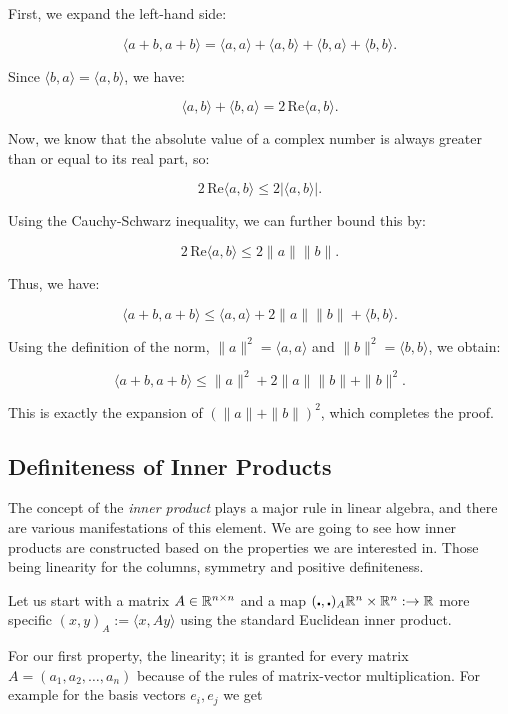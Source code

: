 First, we expand the left-hand side:

\[
    \langle a + b, a + b \rangle = \langle a, a \rangle + \langle a, b \rangle + \langle b, a \rangle + 
    \langle b, b \rangle.
\]

Since \( \langle b, a \rangle = \langle a, b \rangle \), we have:

\[
    \langle a, b \rangle + \langle b, a \rangle = 2 \, \text{Re} \langle a, b \rangle.
\]

Now, we know that the absolute value of a complex number is always greater than or equal to its 
real part, so:

\[
    2 \, \text{Re} \langle a, b \rangle \leq 2 |\langle a, b \rangle|.
\]

Using the Cauchy-Schwarz inequality, we can further bound this by:

\[
    2 \, \text{Re} \langle a, b \rangle \leq 2 \|a\| \|b\|.
\]

Thus, we have:

\[
    \langle a + b, a + b \rangle \leq \langle a, a \rangle + 2 \|a\| \|b\| + \langle b, b \rangle.
\]

Using the definition of the norm, \( \|a\|^2 = \langle a, a \rangle \) and \( \|b\|^2 = \langle b, b 
\rangle \), we obtain:

\[
    \langle a + b, a + b \rangle \leq \|a\|^2 + 2 \|a\| \|b\| + \|b\|^2.
\]

This is exactly the expansion of \( {(\|a\| + \|b\|)}^2 \), which completes the proof.

\QED

\subsection{Definiteness of Inner Products}

The concept of the \emph{inner product} plays a major rule in linear algebra, and there are various 
manifestations of this element. We are going to see how inner products are constructed based on the 
properties we are interested in. Those being linearity for the columns, symmetry and positive definiteness.

Let us start with a matrix \(A \in \mathbb{R}^{n \times n}\) and a map 
\((\centerdot , \centerdot)_A \mathbb{R}^n \times \mathbb{R}^n : \to \mathbb{R} \) more specific 
\((x,y)_A := \langle x, Ay\rangle\) using the standard Euclidean inner product.

For our first property, the linearity; it is granted for every matrix \(A = (a_1, a_2, \dots, a_n)\) 
because of the rules of matrix-vector multiplication. For example for the basis vectors \(e_i, e_j\) 
we get 

